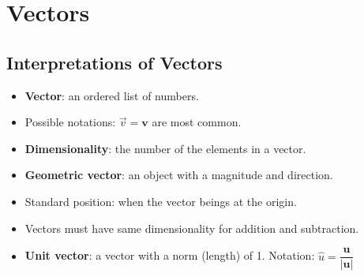 \documentclass[12pt,a4paper]{article}
\begin{document}
\tableofcontents
\cleardoublepage
\fancyhead{}

\clearpage
\section{Vectors}
\subsection{Interpretations of Vectors}
\begin{itemize}
    \item \textbf{Vector}: an ordered list of numbers. 
    \item Possible notations: \(\vec{v}=\bm{v}\) are most common.
    \item \textbf{Dimensionality}: the number of the elements in a vector.
    \item \textbf{Geometric vector}: an object with a magnitude and direction.
    \item {\color{o-Sun}Standard position}: when the vector beings at the origin.
    \item Vectors must have same dimensionality for addition and subtraction.
    \item \textbf{Unit vector}: a vector with a {\color{o-Sun}norm} (length) of 1. Notation: \(\hat{u}=\dfrac{\bm{u}}{|\bm{u}|}\) 
\end{itemize}
\end{document}
